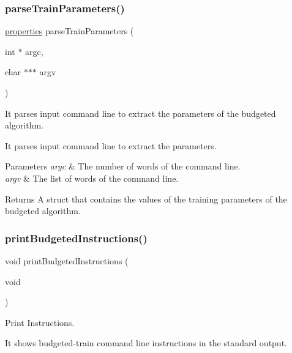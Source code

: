 \subsubsection{\texorpdfstring{parse\+Train\+Parameters()}{parseTrainParameters()}}
{\ttfamily \hyperlink{structproperties}{properties} parse\+Train\+Parameters (\begin{DoxyParamCaption}\item[{int $\ast$}]{argc,  }\item[{char $\ast$$\ast$$\ast$}]{argv }\end{DoxyParamCaption})}



It parses input command line to extract the parameters of the budgeted algorithm. 

It parses input command line to extract the parameters. 
\begin{DoxyParams}{Parameters}
{\em argc} & The number of words of the command line. \\
\hline
{\em argv} & The list of words of the command line. \\
\hline
\end{DoxyParams}
\begin{DoxyReturn}{Returns}
A struct that contains the values of the training parameters of the budgeted algorithm. 
\end{DoxyReturn}
\hypertarget{budgeted-train_8h_a9888789b1c3595806cf34f033fb2aff9}{}\label{budgeted-train_8h_a9888789b1c3595806cf34f033fb2aff9} 
\subsubsection{\texorpdfstring{print\+Budgeted\+Instructions()}{printBudgetedInstructions()}}
{\ttfamily void print\+Budgeted\+Instructions (\begin{DoxyParamCaption}\item[{void}]{ }\end{DoxyParamCaption})}



Print Instructions. 

It shows budgeted-\/train command line instructions in the standard output. \hypertarget{budgeted-train_8h_aa6c8aa8b86b7a0647cc679408c310cd3}{}\label{budgeted-train_8h_aa6c8aa8b86b7a0647cc679408c310cd3} 

